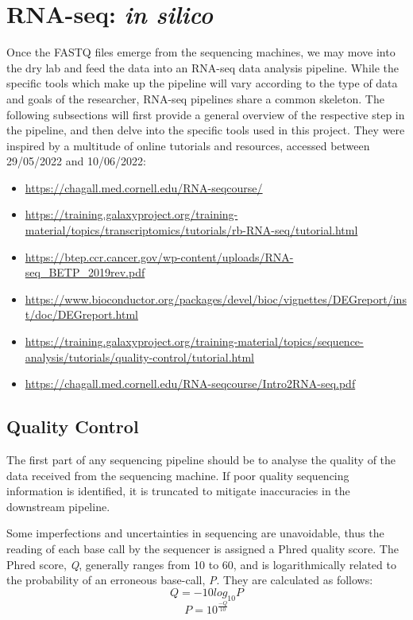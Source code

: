 \clearpage
\section{RNA-seq: \textit{in silico}}
\label{RNA-seq: in silico}

Once the FASTQ files emerge from the sequencing machines, we may move into the dry lab and feed the data into an RNA-seq data analysis pipeline. While the specific tools which make up the pipeline will vary according to the type of data and goals of the researcher, RNA-seq pipelines share a common skeleton. The following subsections will first provide a general overview of the respective step in the pipeline, and then delve into the specific tools used in this project. They were inspired by a multitude of online tutorials and resources, accessed between 29/05/2022 and 10/06/2022:

\begin{itemize}\itemsep-0.5em
\item \url{https://chagall.med.cornell.edu/RNA-seqcourse/}
\item \url{https://training.galaxyproject.org/training-material/topics/transcriptomics/tutorials/rb-RNA-seq/tutorial.html}
\item \url{https://btep.ccr.cancer.gov/wp-content/uploads/RNA-seq_BETP_2019rev.pdf}
\item \url{https://www.bioconductor.org/packages/devel/bioc/vignettes/DEGreport/inst/doc/DEGreport.html}
\item \url{https://training.galaxyproject.org/training-material/topics/sequence-analysis/tutorials/quality-control/tutorial.html}
\item \url{https://chagall.med.cornell.edu/RNA-seqcourse/Intro2RNA-seq.pdf}
\end{itemize}


\subsection{Quality Control}

The first part of any sequencing pipeline should be to analyse the quality of the data received from the sequencing machine. If poor quality sequencing information is identified, it is truncated to mitigate inaccuracies in the downstream pipeline. 

Some imperfections and uncertainties in sequencing are unavoidable, thus the reading of each base call by the sequencer is assigned a Phred quality score. The Phred score, \textit{Q}, generally ranges from 10 to 60, and is logarithmically related to the probability of an erroneous base-call, \textit{P}\citep{ewing1998base}. They are calculated as follows:
$$ Q = -10 log_{10}P $$
 $$P = 10^{\frac{-Q}{10}}$$

